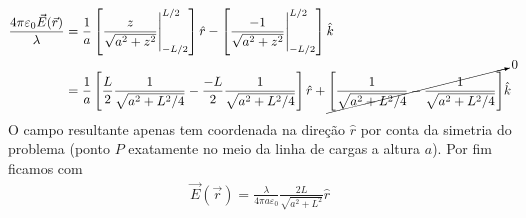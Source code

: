 \begin{prob}
\begin{sol}
\begin{align}
\begin{split}
			\frac{4 \pi \varepsilon_{0}\vec{E}(\vec{r})}{\lambda}	&= \frac{1}{a}\left[\frac{z}{\sqrt{a^{2}+z^{2}}}\Bigg|_{-L/2}^{L/2}\right]\hat{r}-\left[\frac{-1}{\sqrt{a^{2}+z^{2}}}\Bigg|_{-L/2}^{L/2}\right]\hat{k}\\
																														&= \frac{1}{a}\left[\frac{L}{2}\frac{1}{\sqrt{a^{2}+L^{2}/4}}-\frac{-L}{2}\frac{1}{\sqrt{a^{2}+L^{2}/4}}\right]\hat{r}+\cancelto{0}{\left[\frac{1}{\sqrt{a^{2}+L^{2}/4}}-\frac{1}{\sqrt{a^{2}+L^{2}/4}}\right]}\hat{k}
		\end{split}
	\end{align}
	O campo resultante apenas tem coordenada na direção $\hat{r}$ por conta da simetria do problema (ponto $P$ exatamente no meio da linha de cargas a altura $a$). Por fim ficamos com
	\begin{align}
		\boxed{
			\vec{E}(\vec{r}) = \frac{\lambda}{4 \pi a\varepsilon_{0}}\frac{2L}{\sqrt{a^{2}+L^{2}}}\hat{r}
		}
	\end{align}
\end{sol}
\end{prob}
